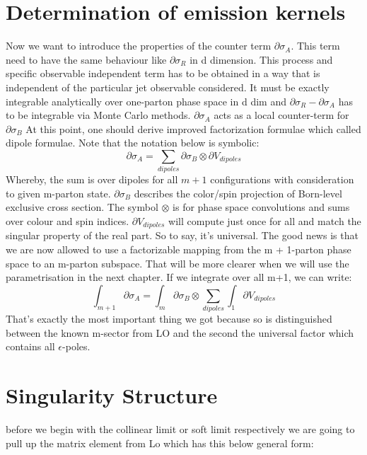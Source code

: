 \section*{Determination of emission kernels}
Now we want to introduce the properties of the counter term $ \partial \sigma_A $. This term need to have the same behaviour like $ \partial \sigma_R $ in d dimension. This process and specific observable independent term has to be obtained in a way that is independent of the particular jet observable considered. It must be exactly integrable analytically over one-parton phase space in d dim and $ \partial \sigma_R -  \partial \sigma_A  $ has to be integrable via Monte Carlo methods. $ \partial \sigma_A $ acts as a local counter-term for $ \partial \sigma_B $
At this point, one should derive improved factorization formulae which called dipole formulae. Note that the notation below is symbolic:
\begin{equation}
\partial \sigma_A = \sum_{dipoles} \partial \sigma_{B} \otimes \partial V_{dipoles}
\end{equation}
Whereby, the sum is over dipoles for all $ m+1 $ configurations with consideration to given m-parton state. $  \partial \sigma_{B}$ describes the color/spin
projection of Born-level exclusive cross section.
The symbol $ \otimes $ is for phase space convolutions and sums over colour and spin indices. $ \partial V_{dipoles} $ will compute just once for all and match the singular property of the real part. So to say, it's universal. The good news is that we are now allowed to use a factorizable mapping from
the m + 1-parton phase space to an m-parton subspace. That will be more clearer when we will use the parametrisation in the next chapter. 
If we integrate over all m+1, we can write:
\begin{equation}
\int_{m+1}\partial \sigma_A =  \int_{m} \partial \sigma_{B} \otimes \sum_{dipoles} \int_{1}\partial V_{dipoles}
\end{equation}
That's exactly the most important thing we got because so is distinguished between the known m-sector from LO and the second the universal factor which contains all $ \epsilon $-poles.
\section*{Singularity Structure}

before we begin with the collinear limit or soft limit respectively we are going to pull up the matrix element from Lo which has this below general form:

